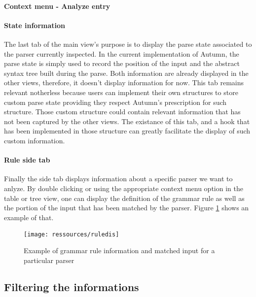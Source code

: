 		\paragraph{Context menu - Analyze entry}

		\paragraph{State information} The last tab of the main view's purpose is to display the parse state associated to the parser currently inspected. In the current implementation of Autumn, the parse state is simply used to record the position of the input and the abstract syntax tree built during the parse. Both information are already displayed in the other views, therefore, it doesn't display information for now. This tab remains relevant notherless because users can implement their own structures to store custom parse state providing they respect Autumn's prescription for such structure. Those custom structure could contain relevant information that has not been captured by the other views. The existance of this tab, and a hook that has been implemented in those structure can greatly facilitate the display of such custom information.


		\paragraph{Rule side tab} Finally the side tab displays information about a specific parser we want to anlyze. By double clicking or using the appropriate context menu option in the table or tree view, one can display the definition of the grammar rule as well as the portion of the input that has been matched by the parser. Figure \ref{fig:ruledis} shows an example of that.

		\begin{figure}[h]
			\texttt{[image: ressources/ruledis]}
			\caption{Example of grammar rule information and matched input for a particular parser} 
			\label{fig:ruledis}
		\end{figure}

		\subsection{Filtering the informations}

